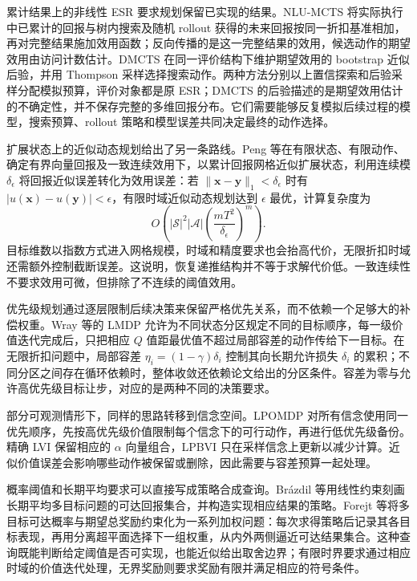 累计结果上的非线性 ESR 要求规划保留已实现的结果。NLU-MCTS 将实际执行中已累计的回报与树内搜索及随机 rollout 获得的未来回报按同一折扣基准相加，再对完整结果施加效用函数；反向传播的是这一完整结果的效用，候选动作的期望效用由访问计数估计\cite{hayes2023}。DMCTS 在同一评价结构下维护期望效用的 bootstrap 近似后验，并用 Thompson 采样选择搜索动作。两种方法分别以上置信探索和后验采样分配模拟预算，评价对象都是原 ESR；DMCTS 的后验描述的是期望效用估计的不确定性，并不保存完整的多维回报分布。它们需要能够反复模拟后续过程的模型，搜索预算、rollout 策略和模型误差共同决定最终的动作选择。

扩展状态上的近似动态规划给出了另一条路线。Peng 等在有限状态、有限动作、确定有界向量回报及一致连续效用下，以累计回报网格近似扩展状态，利用连续模 $\delta_\epsilon$ 将回报近似误差转化为效用误差\cite{peng2025esr}：若 $\|\mathbf x-\mathbf y\|_1<\delta_\epsilon$ 时有 $|u(\mathbf x)-u(\mathbf y)|<\epsilon$，有限时域近似动态规划达到 $\epsilon$ 最优，计算复杂度为
\begin{equation}
O\!\left(|\mathcal S|^2|\mathcal A|\left(\frac{mT^2}{\delta_\epsilon}\right)^m\right).
\end{equation}
目标维数以指数方式进入网格规模，时域和精度要求也会抬高代价，无限折扣时域还需额外控制截断误差。这说明，恢复递推结构并不等于求解代价低。一致连续性不要求效用可微，但排除了不连续的阈值效用。

优先级规划通过逐层限制后续决策来保留严格优先关系，而不依赖一个足够大的补偿权重。Wray 等的 LMDP 允许为不同状态分区规定不同的目标顺序，每一级价值迭代完成后，只把相应 $Q$ 值距最优值不超过局部容差的动作传给下一目标\cite{wray2015lmdp}。在无限折扣问题中，局部容差 $\eta_i=(1-\gamma)\delta_i$ 控制其向长期允许损失 $\delta_i$ 的累积；不同分区之间存在循环依赖时，整体收敛还依赖论文给出的分区条件。容差为零与允许高优先级目标让步，对应的是两种不同的决策要求。

部分可观测情形下，同样的思路转移到信念空间。LPOMDP 对所有信念使用同一优先顺序，先按高优先级价值限制每个信念下的可行动作，再进行低优先级备份\cite{wray2015lpomdp}。精确 LVI 保留相应的 $\alpha$ 向量组合，LPBVI 只在采样信念上更新以减少计算。近似价值误差会影响哪些动作被保留或删除，因此需要与容差预算一起处理。

概率阈值和长期平均要求可以直接写成策略合成查询。Brázdil 等用线性约束刻画长期平均多目标问题的可达回报集合，并构造实现相应结果的策略\cite{brazdil2014}。Forejt 等将多目标可达概率与期望总奖励约束化为一系列加权问题：每次求得策略后记录其各目标表现，再用分离超平面选择下一组权重，从内外两侧逼近可达结果集合\cite{forejt2012pareto}。这种查询既能判断给定阈值是否可实现，也能近似给出取舍边界；有限时界要求通过相应时域的价值迭代处理，无界奖励则要求奖励有限并满足相应的符号条件。

